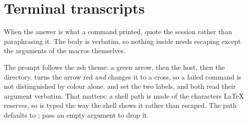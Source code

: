 \section{Terminal transcripts}

When the answer is what a command printed, quote the session rather than paraphrasing it.
The body is verbatim, so nothing inside needs escaping except the arguments of the macros themselves.

\begin{terminal}
\end{terminal}

The prompt follows the  zsh theme: a green arrow, then the host, then the directory.
 turns the arrow red \emph{and} changes it to a cross, so a failed command is not distinguished by colour alone.
 and  set the two labels, and both read their argument verbatim.
That matters: a shell path is made of the characters LaTeX reserves, so  is typed the way the shell shows it rather than escaped.
The path defaults to \code{\textasciitilde}; pass an empty argument to drop it.
